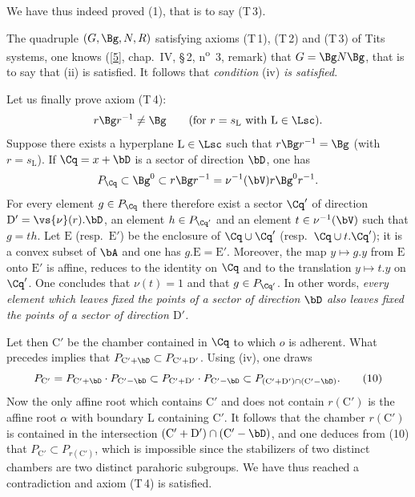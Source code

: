 \documentclass[12pt,a4paper,oneside,english]{smfart}
\makeatletter
\newcommand{\btpageanchor}[1]{\Hy@raisedlink{\hypertarget{p:#1}{}}}
\newcommand{\btbib}[1]{\hyperlink{bib:#1}{#1}}
\newcommand{\btpage}[1]{\marginnote{p.~#1}\btpageanchor{#1}}
\newcommand{\pg}[1]{\btpage{#1}}
\theoremstyle{definition}
\theoremstyle{bt}
\makeatother
\begin{document}
We have thus indeed proved (1), that is to say (T\,3).

\medskip
The quadruple $(G,\Bg,N,R)$ satisfying axioms (T\,1), (T\,2) and (T\,3) of Tits
systems, one knows ([\btbib{5}], chap.~IV, \S\,2, n\textsuperscript{o}~3, remark) that
$G=\Bg N\Bg$, that is to say that (ii) is satisfied. It follows that
\emph{condition} (iv) \emph{is satisfied}.

\smallskip
Let us finally prove axiom (T\,4):
\[
r\Bg r^{-1}\neq\Bg\qquad(\text{for } r=s_{\mathrm{L}}\text{ with }\mathrm{L}\in\Lsc).
\]
Suppose there exists a hyperplane $\mathrm{L}\in\Lsc$ such that
$r\Bg r^{-1}=\Bg$ (with $r=s_{\mathrm{L}}$). If $\Cq=x+\bD$ is a sector of
direction $\bD$, one has
\[
P_{\Cq}\subset\Bg^{0}\subset r\Bg r^{-1}=\nu^{-1}(\bV)r\Bg^{0}r^{-1}.
\]
\pg{92}
For every element $g\in P_{\Cq}$ there therefore exist a sector $\Cq'$ of
direction $\mathrm{D}'=\vs{\nu}(r).\bD$, an element $h\in P_{\Cq'}$ and an
element $t\in\nu^{-1}(\bV)$ such that $g=th$. Let $\mathrm{E}$ (resp.\
$\mathrm{E}'$) be the enclosure of $\Cq\cup\Cq'$ (resp.\ $\Cq\cup t.\Cq'$); it
is a convex subset of $\bA$ and one has $g.\mathrm{E}=\mathrm{E}'$. Moreover,
the map $y\mapsto g.y$ from $\mathrm{E}$ onto $\mathrm{E}'$ is affine, reduces
to the identity on $\Cq$ and to the translation $y\mapsto t.y$ on $\Cq'$. One
concludes that $\nu(t)=1$ and that $g\in P_{\Cq'}$. In other words,
\emph{every element which leaves fixed the points of a sector of direction
$\bD$ also leaves fixed the points of a sector of direction $\mathrm{D}'$.}

Let then $\mathrm{C}'$ be the chamber contained in $\Cq$ to which $o$ is
adherent. What precedes implies that
$P_{\mathrm{C}'+\bD}\subset P_{\mathrm{C}'+\mathrm{D}'}$. Using (iv), one draws
\begin{equation*}
P_{\mathrm{C}'}=P_{\mathrm{C}'+\bD}\cdot P_{\mathrm{C}'-\bD}
\subset P_{\mathrm{C}'+\mathrm{D}'}\cdot P_{\mathrm{C}'-\bD}
\subset P_{(\mathrm{C}'+\mathrm{D}')\cap(\mathrm{C}'-\bD)}.\tag{10}
\end{equation*}
Now the only affine root which contains $\mathrm{C}'$ and does not contain
$r(\mathrm{C}')$ is the affine root $\alpha$ with boundary $\mathrm{L}$
containing $\mathrm{C}'$. It follows that the chamber $r(\mathrm{C}')$ is
contained in the intersection
$(\mathrm{C}'+\mathrm{D}')\cap(\mathrm{C}'-\bD)$, and one deduces from (10)
that $P_{\mathrm{C}'}\subset P_{r(\mathrm{C}')}$, which is impossible since the
stabilizers of two distinct chambers are two distinct parahoric subgroups. We
have thus reached a contradiction and axiom (T\,4) is satisfied.
\end{document}
